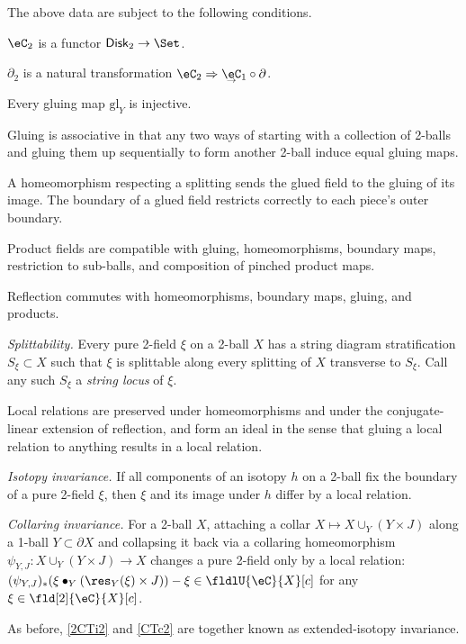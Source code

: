 \documentclass[12pt,reqno]{amsart}
\newcommand{\glu}{\mathrm{gl}}
\newcommand{\Disk}{\mathsf{Disk}}
\newcommand{\C}{\eC}
\newcommand{\blt}{\bullet}
\newcommand{\fcj}[1]{\overline{#1}}
\newcommand{\defn}[1]{\emph{#1}}
\newcommand{\undCtemp}{\bgroup\smash[b]{\text{$\underset{\smash{\raisebox{.225em}{$\scriptstyle\kern.05ex\rightarrow$}}}{\smash{\C}}$}}\egroup}
\newcommand{\undC}{\vphantom{\C}{\undCtemp}}
\begin{document}
The above data are subject to the following conditions.
\begin{lst}
\item[(C$\varphi$)]\label{2Cvarphi2} $\C_2$ is a functor $\Disk_2\to\Set$.
\item[(C$\partial$)]\label{2Cbdy2} $\partial_2$ is a natural transformation $\C_2\Rightarrow\undC_1\circ\partial$.
\item[(CGi)]\label{2CGi2} Every gluing map $\glu_Y$ is injective.
\item[(CGa)]\label{2CGa2} Gluing is associative in that any two ways of starting with a collection of 2-balls and gluing them up sequentially to form another 2-ball induce equal gluing maps.
\item[(CG)]\label{2CG2} A homeomorphism respecting a splitting sends the glued field to the gluing of its image. The boundary of a glued field restricts correctly to each piece's outer boundary.
\item[(C$\pi$)]\label{2Cpi2} Product fields are compatible with gluing, homeomorphisms, boundary maps, restriction to sub-balls, and composition of pinched product maps.
\item[(C$\fcj{\,\cdot\,}$)]\label{2Cfcj2} Reflection commutes with homeomorphisms, boundary maps, gluing, and products.
\item[(CS)]\label{2CS2} \emph{Splittability.} Every pure 2-field $\xi$ on a 2-ball $X$ has a string diagram stratification $S_\xi\subset X$ such that $\xi$ is splittable along every splitting of $X$ transverse to $S_\xi$. Call any such $S_\xi$ a \defn{string locus} of $\xi$.
\item[(C$U$)]\label{2CU2} Local relations are preserved under homeomorphisms and under the conjugate-linear extension of reflection, and form an ideal in the sense that gluing a local relation to anything results in a local relation.
\item[(C$U$i)]\label{2CTi2} \emph{Isotopy invariance.} If all components of an isotopy $h$ on a 2-ball fix the boundary of a pure 2-field $\xi$, then $\xi$ and its image under $h$ differ by a local relation.
\item[(C$U$c)]\label{CTc2} \emph{Collaring invariance.} For a 2-ball $X$, attaching a collar $X\mapsto X\cup_Y(Y\times J)$ along a 1-ball $Y\subset\partial X$ and collapsing it back via a collaring homeomorphism $\psi_{Y,J}\colon X\cup_Y(Y\times J)\to X$ changes a pure 2-field only by a local relation: $(\psi_{Y,J})_*(\xi\blt_Y(\res_Y(\xi)\times J))-\xi\in\fldlU{\C}{X}[c]$ for any $\xi\in\fld[2]{\C}{X}[c]$.
\end{lst}
As before, \ref{2CTi2} and \ref{CTc2} are together known as extended-isotopy invariance.
\end{document}
